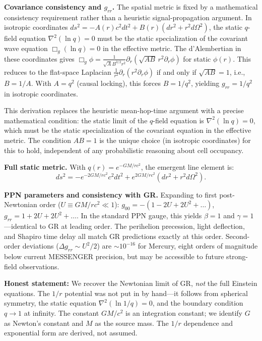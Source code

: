 \documentclass[aps,prd,twocolumn,showpacs,superscriptaddress,preprintnumbers]{revtex4-2}
\begin{document}
\textbf{Covariance consistency and $g_{rr}$.}
The spatial metric is fixed by a mathematical consistency requirement rather than a heuristic signal-propagation argument. In isotropic coordinates $ds^2 = -A(r)c^2dt^2 + B(r)(dr^2 + r^2d\Omega^2)$, the static $q$-field equation $\nabla^2(\ln q)=0$ must be the static specialization of the covariant wave equation $\Box_g(\ln q)=0$ in the effective metric. The d'Alembertian in these coordinates gives $\Box_g\phi = \frac{1}{\sqrt{A}B^{3/2}r^2}\partial_r(\sqrt{AB}\,r^2\partial_r\phi)$ for static $\phi(r)$. This reduces to the flat-space Laplacian $\frac{1}{r^2}\partial_r(r^2\partial_r\phi)$ if and only if $\sqrt{AB}=1$, i.e., $B=1/A$. With $A = q^2$ (causal locking), this forces $B = 1/q^2$, yielding $g_{rr} = 1/q^2$ in isotropic coordinates.

This derivation replaces the heuristic mean-hop-time argument with a precise mathematical condition: the static limit of the $q$-field equation is $\nabla^2(\ln q)=0$, which must be the static specialization of the covariant equation in the effective metric. The condition $AB=1$ is the unique choice (in isotropic coordinates) for this to hold, independent of any probabilistic reasoning about cell occupancy.

\textbf{Full static metric.}
With $q(r) = e^{-GM/rc^2}$, the emergent line element is:
\begin{equation}
\boxed{ds^2 = -e^{-2GM/rc^2}c^2dt^2 + e^{2GM/rc^2}(dr^2 + r^2d\Omega^2)}.
\label{eq:metric}
\end{equation}

\textbf{PPN parameters and consistency with GR.}
Expanding to first post-Newtonian order ($U \equiv GM/rc^2 \ll 1$):
$g_{00} = -(1 - 2U + 2U^2 + \ldots)$, $g_{rr} = 1 + 2U + 2U^2 + \ldots$.
In the standard PPN gauge, this yields $\beta = 1$ and $\gamma = 1$---identical to GR at leading order.
The perihelion precession, light deflection, and Shapiro time delay all match GR predictions exactly at this order.
Second-order deviations ($\Delta g_{rr} \sim U^2/2$) are $\sim10^{-16}$ for Mercury, eight orders of magnitude below current MESSENGER precision, but may be accessible to future strong-field observations.

\textbf{Honest statement:} We recover the Newtonian limit of GR, \emph{not} the full Einstein equations.
The $1/r$ potential was not put in by hand---it follows from spherical symmetry, the static equation $\nabla^2(\ln 1/q)=0$, and the boundary condition $q\to1$ at infinity.
The constant $GM/c^2$ is an integration constant; we identify $G$ as Newton's constant and $M$ as the source mass.
The $1/r$ dependence and exponential form are derived, not assumed.
\end{document}
